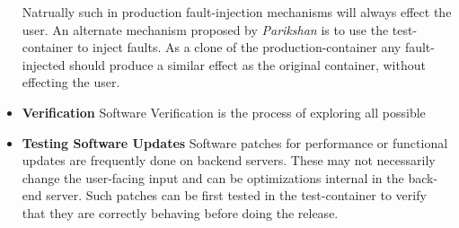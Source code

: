 \begin{itemize}
Natrually such in production fault-injection mechanisms will always effect the user. 
An alternate mechanism proposed by \emph{Parikshan} is to use the test-container to inject faults. 
As a clone of the production-container any fault-injected should produce a similar effect as the original container, without effecting the user.
  \item \textbf{Verification}
Software Verification is the process of exploring all possible 
  \item \textbf{Testing Software Updates}
Software patches for performance or functional updates are frequently done on backend servers. 
These may not necessarily change the user-facing input and can be optimizations internal in the back-end server.
Such patches can be first tested in the test-container to verify that they are correctly behaving before doing the release.
\end{itemize}
